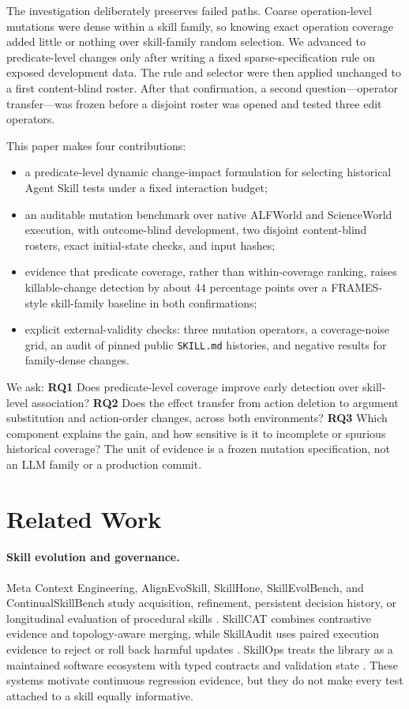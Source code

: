 \documentclass[10pt]{article}
\begin{document}
The investigation deliberately preserves failed paths. Coarse operation-level mutations were dense within a skill family, so knowing exact operation coverage added little or nothing over skill-family random selection. We advanced to predicate-level changes only after writing a fixed sparse-specification rule on exposed development data. The rule and selector were then applied unchanged to a first content-blind roster. After that confirmation, a second question---operator transfer---was frozen before a disjoint roster was opened and tested three edit operators.

This paper makes four contributions:
\begin{itemize}
  \item a predicate-level dynamic change-impact formulation for selecting historical Agent Skill tests under a fixed interaction budget;
  \item an auditable mutation benchmark over native ALFWorld and ScienceWorld execution, with outcome-blind development, two disjoint content-blind rosters, exact initial-state checks, and input hashes;
  \item evidence that predicate coverage, rather than within-coverage ranking, raises killable-change detection by about 44 percentage points over a FRAMES-style skill-family baseline in both confirmations;
  \item explicit external-validity checks: three mutation operators, a coverage-noise grid, an audit of pinned public \texttt{SKILL.md} histories, and negative results for family-dense changes.
\end{itemize}

We ask: \textbf{RQ1} Does predicate-level coverage improve early detection over skill-level association? \textbf{RQ2} Does the effect transfer from action deletion to argument substitution and action-order changes, across both environments? \textbf{RQ3} Which component explains the gain, and how sensitive is it to incomplete or spurious historical coverage? The unit of evidence is a frozen mutation specification, not an LLM family or a production commit.

\section{Related Work}
\paragraph{Skill evolution and governance.}
Meta Context Engineering, AlignEvoSkill, SkillHone, SkillEvolBench, and ContinualSkillBench study acquisition, refinement, persistent decision history, or longitudinal evaluation of procedural skills \citep{ye2026mce,wang2025alignevoskill,li2026skillhone,lei2026skillevolbench,guan2026continualskillbench}. SkillCAT combines contrastive evidence and topology-aware merging, while SkillAudit uses paired execution evidence to reject or roll back harmful updates \citep{chen2026skillcat,gao2026skillaudit}. SkillOps treats the library as a maintained software ecosystem with typed contracts and validation state \citep{song2026skillops}. These systems motivate continuous regression evidence, but they do not make every test attached to a skill equally informative.
\end{document}
